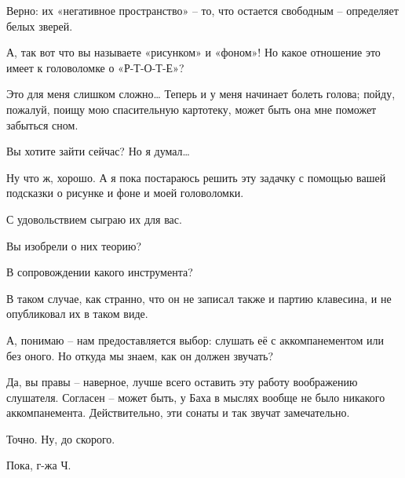 \documentclass[../main.tex]{subfiles}
\begin{document}
\begin{dialogue}
 Верно: их «негативное пространство» \--- то, что остается свободным \--- определяет белых зверей.

 А, так вот что вы называете «рисунком» и «фоном»! Но какое отношение это имеет к головоломке о «Р-Т-О-Т-Е»?

 Это для меня слишком сложно\ldots{} Теперь и у меня начинает болеть голова; пойду, пожалуй, поищу мою спасительную картотеку, может быть она мне поможет забыться сном.

 Вы хотите зайти сейчас? Но я думал\ldots{}

 Ну что ж, хорошо. А я пока постараюсь решить эту задачку с помощью вашей подсказки о рисунке и фоне и моей головоломки.

 С удовольствием сыграю их для вас.

 Вы изобрели о них теорию?

 В сопровождении какого инструмента?

 В таком случае, как странно, что он не записал также и партию клавесина, и не опубликовал их в таком виде.

 А, понимаю \--- нам предоставляется выбор: слушать её с аккомпанементом или без оного. Но откуда мы знаем, как он должен звучать?

 Да, вы правы \--- наверное, лучше всего оставить эту работу воображению слушателя. Согласен \--- может быть, у Баха в мыслях вообще не было никакого аккомпанемента. Действительно, эти сонаты и так звучат замечательно.

 Точно. Ну, до скорого.

 Пока, г-жа Ч.

\end{dialogue}
\end{document}
